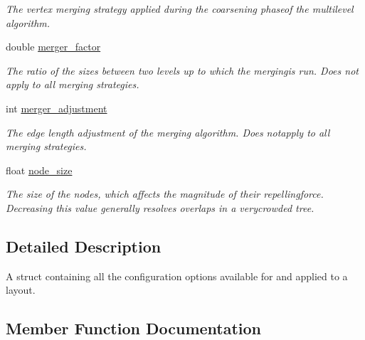 \begin{DoxyCompactItemize}
\begin{DoxyCompactList}\small\item\em The vertex merging strategy applied during the coarsening phaseof the multilevel algorithm. \end{DoxyCompactList}\item 
\mbox{\label{structtmap_1_1LayoutConfiguration_a72fe4f8f738d2d400f70db97c4273a46}} 
double \hyperlink{structtmap_1_1LayoutConfiguration_a72fe4f8f738d2d400f70db97c4273a46}{merger\+\_\+factor}
\begin{DoxyCompactList}\small\item\em The ratio of the sizes between two levels up to which the mergingis run. Does not apply to all merging strategies. \end{DoxyCompactList}\item 
\mbox{\label{structtmap_1_1LayoutConfiguration_a16109420c8ec0a4c3021345fd943daf6}} 
int \hyperlink{structtmap_1_1LayoutConfiguration_a16109420c8ec0a4c3021345fd943daf6}{merger\+\_\+adjustment}
\begin{DoxyCompactList}\small\item\em The edge length adjustment of the merging algorithm. Does notapply to all merging strategies. \end{DoxyCompactList}\item 
\mbox{\label{structtmap_1_1LayoutConfiguration_a9a97e2c0c9edb212190d3afcc3ce2924}} 
float \hyperlink{structtmap_1_1LayoutConfiguration_a9a97e2c0c9edb212190d3afcc3ce2924}{node\+\_\+size}
\begin{DoxyCompactList}\small\item\em The size of the nodes, which affects the magnitude of their repellingforce. Decreasing this value generally resolves overlaps in a verycrowded tree. \end{DoxyCompactList}\end{DoxyCompactItemize}


\subsection{Detailed Description}
A struct containing all the configuration options available for and applied to a layout. 

\subsection{Member Function Documentation}
\mbox{\label{structtmap_1_1LayoutConfiguration_a498341508ea4806795f44e376af18e11}} 
